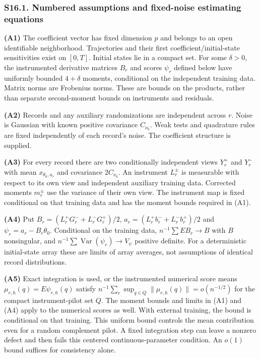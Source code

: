 \documentclass[
  american,
  11pt,
]{article}
\begin{document}
\subsubsection{S16.1. Numbered assumptions and fixed-noise estimating
equations}\label{s16.1.-numbered-assumptions-and-fixed-noise-estimating-equations}

\textbf{(A1)} The coefficient vector has fixed dimension \(p\) and
belongs to an open identifiable neighborhood. Trajectories and their
first coefficient/initial-state sensitivities exist on \([0,T]\).
Initial states lie in a compact set. For some \(\delta>0\), the
instrumented derivative matrices \(B_r\) and scores \(\psi_r\) defined
below have uniformly bounded \(4+\delta\) moments, conditional on the
independent training data. Matrix norms are Frobenius norms. These are
bounds on the products, rather than separate second-moment bounds on
instruments and residuals.

\textbf{(A2)} Records and any auxiliary randomizations are independent
across \(r\). Noise is Gaussian with known positive covariance
\(C_{\nu_0}\). Weak tests and quadrature rules are fixed independently
of each record's noise. The coefficient structure is supplied.

\textbf{(A3)} For every record there are two conditionally independent
views \(Y_r^+\) and \(Y_r^-\) with mean \(x_{\theta_0,u_r}\) and
covariance \(2C_{\nu_0}\). An instrument \(L_r^\pm\) is measurable with
respect to its own view and independent auxiliary training data.
Corrected moments \(m_r^\pm\) use the variance of their own view. The
instrument map is fixed conditional on that training data and has the
moment bounds required in (A1).

\textbf{(A4)} Put \(B_r=(L_r^+G_r^-+L_r^-G_r^+)/2\),
\(a_r=(L_r^+b_r^-+L_r^-b_r^+)/2\) and \(\psi_r=a_r-B_r\theta_0\).
Conditional on the training data, \(n^{-1}\sum E B_r\to B\) with \(B\)
nonsingular, and \(n^{-1}\sum\operatorname{Var}(\psi_r)\to V_\psi\)
positive definite. For a deterministic initial-state array these are
limits of array averages, not assumptions of identical record
distributions.

\textbf{(A5)} Exact integration is used, or the instrumented numerical
score means \(\mu_{r,h}(q)=E\psi_{r,h}(q)\) satisfy
\(n^{-1}\sum_r\sup_{q\in Q}\|\mu_{r,h}(q)\|=o(n^{-1/2})\) for the
compact instrument-pilot set \(Q\). The moment bounds and limits in (A1)
and (A4) apply to the numerical scores as well. With external training,
the bound is conditional on that training. This uniform bound controls
the mean contribution even for a random complement pilot. A fixed
integration step can leave a nonzero defect and then fails this centered
continuous-parameter condition. An \(o(1)\) bound suffices for
consistency alone.
\end{document}
